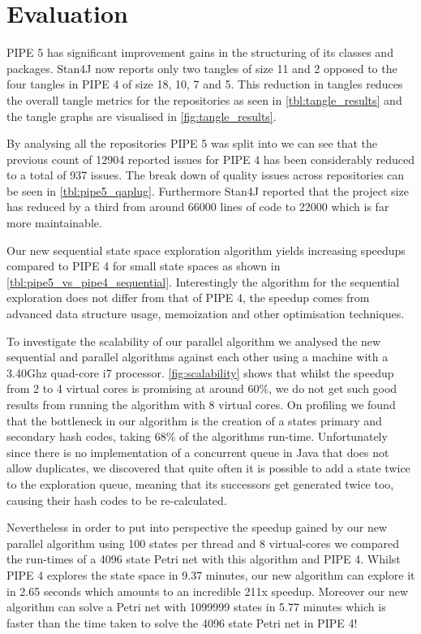 \section{Evaluation}

PIPE 5 has significant improvement gains in the structuring of its classes and packages. Stan4J now reports only two tangles of size 11 and 2 opposed to the four tangles in PIPE 4 of size 18, 10, 7 and 5. This reduction in tangles reduces the overall tangle metrics for the repositories as seen in \cref{tbl:tangle_results} and the tangle graphs are visualised in \cref{fig:tangle_results}. 



By analysing all the repositories PIPE 5 was split into we can see that the previous count of \num{12904} reported issues for PIPE 4 has been considerably reduced to a total of \num{937} issues. The break down of quality issues across repositories can be seen in \cref{tbl:pipe5_qaplug}. Furthermore Stan4J reported that the project size has reduced by a third from around \num{66000} lines of code to \num{22000} which is far more maintainable.




Our new sequential state space exploration algorithm  yields increasing speedups compared to PIPE 4 for small state spaces as shown in \cref{tbl:pipe5_vs_pipe4_sequential}. Interestingly the algorithm for the sequential exploration does not differ from that of PIPE 4, the speedup comes from advanced data structure usage, memoization and other optimisation techniques.



To investigate the scalability of our parallel algorithm we analysed the new sequential and parallel algorithms against each other using a machine with a 3.40Ghz quad-core i7 processor. \cref{fig:scalability} shows that whilst the speedup from 2 to 4 virtual cores is promising at around 60\%, we do not get such good results from running the algorithm with 8 virtual cores. On profiling we found that the bottleneck in our algorithm is the creation of a states primary and secondary hash codes, taking 68\% of the algorithms run-time. Unfortunately since there is no implementation of a concurrent queue in Java that does not allow duplicates, we discovered that quite often it is possible to add a state twice to the exploration queue, meaning that its successors get generated twice too, causing their hash codes to be re-calculated.



Nevertheless in order to put into perspective the speedup gained by our new parallel algorithm using 100 states per thread and 8 virtual-cores we compared the run-times of a 4096 state Petri net with this algorithm and PIPE 4. Whilst PIPE 4 explores the state space in 9.37 minutes, our new algorithm can explore it in 2.65 seconds which amounts to an incredible 211x speedup. Moreover our new algorithm can solve a Petri net with \num{1099999} states in 5.77 minutes which is faster than the time taken to solve the 4096 state Petri net in PIPE 4!
